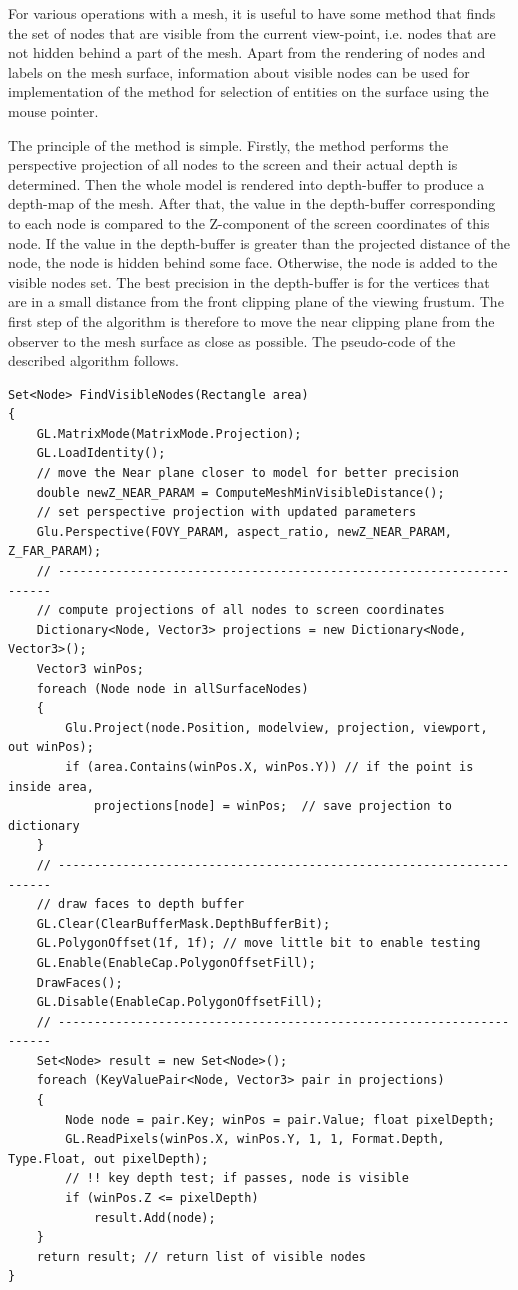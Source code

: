 For various operations with a mesh, it is useful to have some method that finds the set of nodes that are visible from the current view-point, i.e. nodes that are not hidden behind a part of the mesh. Apart from the rendering of nodes and labels on the mesh surface, information about visible nodes can be used for implementation of the method for selection of entities on the surface using the mouse pointer.

The principle of the method is simple. Firstly, the method performs the perspective projection of all nodes to the screen and their actual depth is determined. Then the whole model is rendered into depth-buffer to produce a depth-map of the mesh. After that, the value in the depth-buffer corresponding to each node is compared to the Z-component of the screen coordinates of this node. If the value in the depth-buffer is greater than the projected distance of the node, the node is hidden behind some face. Otherwise, the node is added to the visible nodes set. The best precision in the depth-buffer is for the vertices that are in a small distance from the front clipping plane of the viewing frustum. The first step of the algorithm is therefore to move the near clipping plane from the observer to the mesh surface as close as possible. The pseudo-code of the described algorithm follows.

{\small
\begin{Verbatim}[obeytabs,tabsize=4]
Set<Node> FindVisibleNodes(Rectangle area)
{
	GL.MatrixMode(MatrixMode.Projection);
	GL.LoadIdentity();
	// move the Near plane closer to model for better precision
	double newZ_NEAR_PARAM = ComputeMeshMinVisibleDistance();
	// set perspective projection with updated parameters
	Glu.Perspective(FOVY_PARAM, aspect_ratio, newZ_NEAR_PARAM, Z_FAR_PARAM);
	// ---------------------------------------------------------------------
	// compute projections of all nodes to screen coordinates
	Dictionary<Node, Vector3> projections = new Dictionary<Node, Vector3>();
	Vector3 winPos;
	foreach (Node node in allSurfaceNodes)
	{
		Glu.Project(node.Position, modelview, projection, viewport, out winPos);
		if (area.Contains(winPos.X, winPos.Y)) // if the point is inside area,
			projections[node] = winPos;  // save projection to dictionary
	}
	// ---------------------------------------------------------------------
	// draw faces to depth buffer
	GL.Clear(ClearBufferMask.DepthBufferBit);
	GL.PolygonOffset(1f, 1f); // move little bit to enable testing
	GL.Enable(EnableCap.PolygonOffsetFill);
	DrawFaces();
	GL.Disable(EnableCap.PolygonOffsetFill);
	// ---------------------------------------------------------------------
	Set<Node> result = new Set<Node>();
	foreach (KeyValuePair<Node, Vector3> pair in projections)
	{
		Node node = pair.Key; winPos = pair.Value; float pixelDepth;
		GL.ReadPixels(winPos.X, winPos.Y, 1, 1, Format.Depth, Type.Float, out pixelDepth);
		// !! key depth test; if passes, node is visible
		if (winPos.Z <= pixelDepth)
			result.Add(node);
	}
	return result; // return list of visible nodes
}
\end{Verbatim}
}

